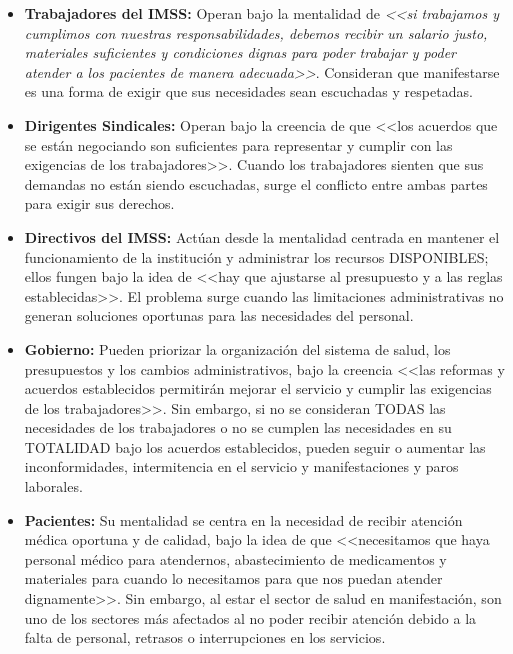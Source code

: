 \documentclass[12pt,letterpaper]{article}
\begin{document}
\begin{itemize}
  \item \textbf{Trabajadores del IMSS:} Operan bajo la mentalidad de \textit{<<si trabajamos y cumplimos con nuestras responsabilidades, debemos recibir un salario justo, materiales suficientes y condiciones dignas para poder trabajar y poder atender a los pacientes de manera adecuada>>}. Consideran que manifestarse es una forma de exigir que sus necesidades sean escuchadas y respetadas.

  \item \textbf{Dirigentes Sindicales:} Operan bajo la creencia de que <<los acuerdos que se están negociando son suficientes para representar y cumplir con las exigencias de los trabajadores>>. Cuando los trabajadores sienten que sus demandas no están siendo escuchadas, surge el conflicto entre ambas partes para exigir sus derechos.

  \item \textbf{Directivos del IMSS:} Actúan desde la mentalidad centrada en mantener el funcionamiento de la institución y administrar los recursos DISPONIBLES; ellos fungen bajo la idea de <<hay que ajustarse al presupuesto y a las reglas establecidas>>. El problema surge cuando las limitaciones administrativas no generan soluciones oportunas para las necesidades del personal.

  \item \textbf{Gobierno:} Pueden priorizar la organización del sistema de salud, los presupuestos y los cambios administrativos, bajo la creencia <<las reformas y acuerdos establecidos permitirán mejorar el servicio y cumplir las exigencias de los trabajadores>>. Sin embargo, si no se consideran TODAS las necesidades de los trabajadores o no se cumplen las necesidades en su TOTALIDAD bajo los acuerdos establecidos, pueden seguir o aumentar las inconformidades, intermitencia en el servicio y manifestaciones y paros laborales.

  \item \textbf{Pacientes:} Su mentalidad se centra en la necesidad de recibir atención médica oportuna y de calidad, bajo la idea de que <<necesitamos que haya personal médico para atendernos, abastecimiento de medicamentos y materiales para cuando lo necesitamos para que nos puedan atender dignamente>>. Sin embargo, al estar el sector de salud en manifestación, son uno de los sectores más afectados al no poder recibir atención debido a la falta de personal, retrasos o interrupciones en los servicios.
\end{itemize}
\end{document}
